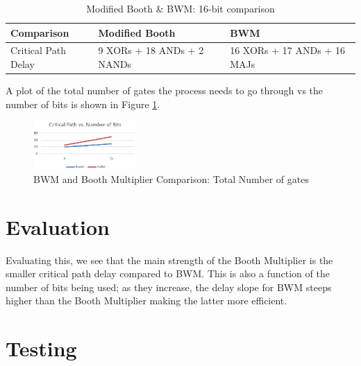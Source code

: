 \documentclass[journal]{IEEEtran}
\begin{document}
\begin{table}[!h]
\renewcommand{\arraystretch}{1.2}
\caption{Modified Booth \& BWM: 16-bit comparison}
\label{tab:t9}
\centering
\begin{tabular}{| p{2cm} | p{2cm} | p{2cm} | }
\hline
\textbf{Comparison} & \textbf{Modified Booth} & 
\textbf{BWM}\\\hline
Critical Path Delay & 9 XORs + 18 ANDs + 2 NANDs 
& 16 XORs + 17 ANDs + 16 MAJs\\\hline
\end{tabular}
\end{table}


A plot of the total number of gates the process needs to go through vs the number of bits is shown in Figure \ref{fig:14}.

\begin{figure}[h!]
  \centering
  \includegraphics[width=0.35\textwidth]{14.png}
  \centering
  \caption{BWM and Booth Multiplier Comparison: Total Number of gates}
  \label{fig:14}
\end{figure}

\vspace{-5pt}

\section{Evaluation}

Evaluating this, we see that the main strength of the Booth Multiplier is the smaller critical path delay compared to BWM. 
This is also a function of the number of bits being used; as they increase, the delay slope 
for BWM steeps higher than the Booth Multiplier making the latter more efficient.



\section{Testing}
\end{document}
